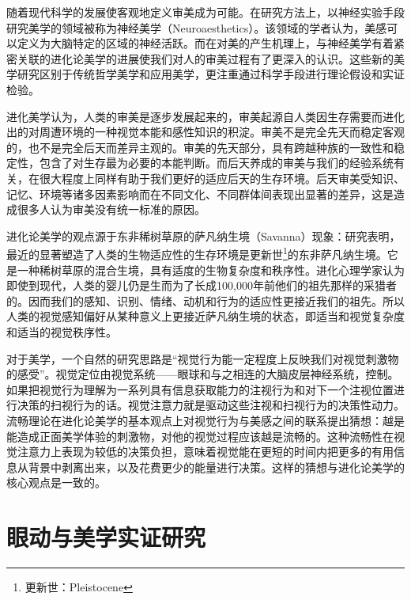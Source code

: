 随着现代科学的发展使客观地定义审美成为可能。在研究方法上，以神经实验手段研究美学的领域被称为神经美学（Neuroaesthetics）。该领域的学者认为，美感可以定义为大脑特定的区域的神经活跃。而在对美的产生机理上，与神经美学有着紧密关联的进化论美学的进展使我们对人的审美过程有了更深入的认识。这些新的美学研究区别于传统哲学美学和应用美学，更注重通过科学手段进行理论假设和实证检验。

进化美学认为，人类的审美是逐步发展起来的，审美起源自人类因生存需要而进化出的对周遭环境的一种视觉本能和感性知识的积淀。审美不是完全先天而稳定客观的，也不是完全后天而差异主观的。审美的先天部分，具有跨越种族的一致性和稳定性，包含了对生存最为必要的本能判断。而后天养成的审美与我们的经验系统有关，在很大程度上同样有助于我们更好的适应后天的生存环境。后天审美受知识、记忆、环境等诸多因素影响而在不同文化、不同群体间表现出显著的差异，这是造成很多人认为审美没有统一标准的原因。

进化论美学的观点源于东非稀树草原的萨凡纳生境（Savanna）现象：研究表明，最近的显著塑造了人类的生物适应性的生存环境是更新世\footnote{更新世：Pleistocene}的东非萨凡纳生境。它是一种稀树草原的混合生境，具有适度的生物复杂度和秩序性。进化心理学家认为即使到现代，人类的婴儿仍是生而为了长成100,000年前他们的祖先那样的采猎者的。因而我们的感知、识别、情绪、动机和行为的适应性更接近我们的祖先。所以人类的视觉感知偏好从某种意义上更接近萨凡纳生境的状态，即适当和视觉复杂度和适当的视觉秩序性。

对于美学，一个自然的研究思路是“视觉行为能一定程度上反映我们对视觉刺激物的感受”。视觉定位由视觉系统——眼球和与之相连的大脑皮层神经系统，控制。如果把视觉行为理解为一系列具有信息获取能力的注视行为和对下一个注视位置进行决策的扫视行为的话。视觉注意力就是驱动这些注视和扫视行为的决策性动力。流畅理论在进化论美学的基本观点上对视觉行为与美感之间的联系提出猜想：越是能造成正面美学体验的刺激物，对他的视觉过程应该越是流畅的。这种流畅性在视觉注意力上表现为较低的决策负担，意味着视觉能在更短的时间内把更多的有用信息从背景中剥离出来，以及花费更少的能量进行决策。这样的猜想与进化论美学的核心观点是一致的。

\section{眼动与美学实证研究}

